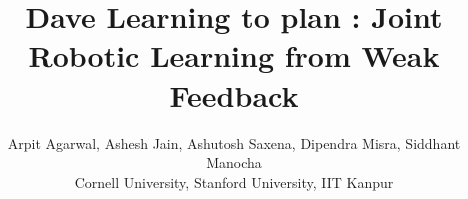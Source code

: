 \documentclass[letterpaper, 10 pt, conference]{ieeeconf}  %
\begin{document}
\title{Dave Learning to plan : Joint Robotic Learning from Weak Feedback}

\author{Arpit Agarwal, Ashesh Jain, Ashutosh Saxena, Dipendra Misra, Siddhant Manocha \\
Cornell University, Stanford University, IIT Kanpur\\}


\maketitle
\maketitle

\IEEEpeerreviewmaketitle





















\end{document}
